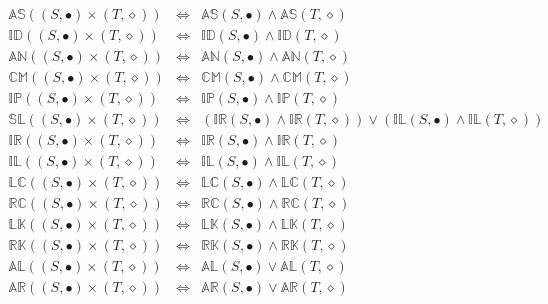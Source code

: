 \documentclass[10pt]{article}
\newcommand{\propname}[1]{{\mathbb{#1}}}
\begin{document}
\[
\begin{array}{rcl} 
\propname{AS}((S, \bullet) \times (T, \diamond)) 
   & \Leftrightarrow %
   & \propname{AS}(S, \bullet) \wedge  \propname{AS}(T, \diamond) \\ 
\propname{ID}((S, \bullet) \times (T, \diamond)) 
   & \Leftrightarrow %
   & \propname{ID}(S, \bullet) \wedge  \propname{ID}(T, \diamond) \\ 
\propname{AN}((S, \bullet) \times (T, \diamond)) 
   & \Leftrightarrow %
   & \propname{AN}(S, \bullet) \wedge  \propname{AN}(T, \diamond) \\ 
\propname{CM}((S, \bullet) \times (T, \diamond)) 
   & \Leftrightarrow %
   & \propname{CM}(S, \bullet) \wedge  \propname{CM}(T, \diamond) \\ 
\propname{IP}((S, \bullet) \times (T, \diamond)) 
   & \Leftrightarrow %
   & \propname{IP}(S, \bullet) \wedge  \propname{IP}(T, \diamond) \\ 
\propname{SL}((S, \bullet) \times (T, \diamond)) 
    & \Leftrightarrow %
    & (\propname{IR}(S, \bullet) \wedge  \propname{IR}(T, \diamond)) 
      \vee 
      (\propname{IL}(S, \bullet) \wedge  \propname{IL}(T, \diamond)) \\ 
\propname{IR}((S, \bullet) \times (T, \diamond)) 
   & \Leftrightarrow %
   & \propname{IR}(S, \bullet) \wedge  \propname{IR}(T, \diamond) \\ 
\propname{IL}((S, \bullet) \times (T, \diamond)) 
   & \Leftrightarrow %
   & \propname{IL}(S, \bullet) \wedge  \propname{IL}(T, \diamond) \\ 
\propname{LC}((S, \bullet) \times (T, \diamond)) 
   & \Leftrightarrow %
   & \propname{LC}(S, \bullet) \wedge  \propname{LC}(T, \diamond) \\ 
\propname{RC}((S, \bullet) \times (T, \diamond)) 
   & \Leftrightarrow %
   & \propname{RC}(S, \bullet) \wedge  \propname{RC}(T, \diamond) \\ 
\propname{LK}((S, \bullet) \times (T, \diamond)) 
   & \Leftrightarrow %
   & \propname{LK}(S, \bullet) \wedge  \propname{LK}(T, \diamond) \\ 
\propname{RK}((S, \bullet) \times (T, \diamond)) 
   & \Leftrightarrow %
   & \propname{RK}(S, \bullet) \wedge  \propname{RK}(T, \diamond) \\ 
\propname{AL}((S, \bullet) \times (T, \diamond)) 
   & \Leftrightarrow %
   &  \propname{AL}(S, \bullet) \vee  \propname{AL}(T, \diamond) \\ 
\propname{AR}((S, \bullet) \times (T, \diamond))  
   & \Leftrightarrow %
   & \propname{AR}(S, \bullet) \vee  \propname{AR}(T, \diamond) \\ 
\end{array} 
\] 
\end{document}
